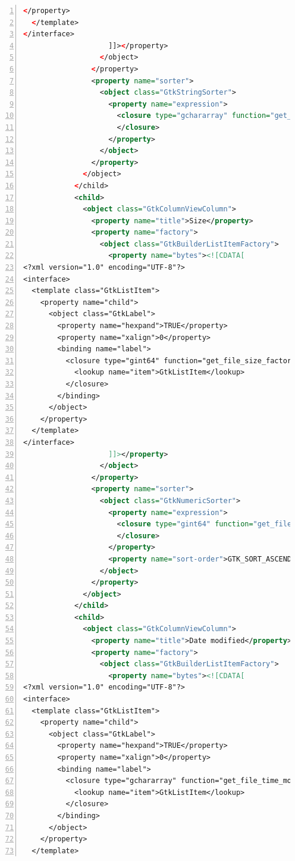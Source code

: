 \begin{lstlisting}[language=XML, numbers=left]
    </property>
  </template>
</interface>
                    ]]></property>
                  </object>
                </property>
                <property name="sorter">
                  <object class="GtkStringSorter">
                    <property name="expression">
                      <closure type="gchararray" function="get_file_name">
                      </closure>
                    </property>
                  </object>
                </property>
              </object>
            </child>
            <child>
              <object class="GtkColumnViewColumn">
                <property name="title">Size</property>
                <property name="factory">
                  <object class="GtkBuilderListItemFactory">
                    <property name="bytes"><![CDATA[
<?xml version="1.0" encoding="UTF-8"?>
<interface>
  <template class="GtkListItem">
    <property name="child">
      <object class="GtkLabel">
        <property name="hexpand">TRUE</property>
        <property name="xalign">0</property>
        <binding name="label">
          <closure type="gint64" function="get_file_size_factory">
            <lookup name="item">GtkListItem</lookup>
          </closure>
        </binding>
      </object>
    </property>
  </template>
</interface>
                    ]]></property>
                  </object>
                </property>
                <property name="sorter">
                  <object class="GtkNumericSorter">
                    <property name="expression">
                      <closure type="gint64" function="get_file_size">
                      </closure>
                    </property>
                    <property name="sort-order">GTK_SORT_ASCENDING</property>
                  </object>
                </property>
              </object>
            </child>
            <child>
              <object class="GtkColumnViewColumn">
                <property name="title">Date modified</property>
                <property name="factory">
                  <object class="GtkBuilderListItemFactory">
                    <property name="bytes"><![CDATA[
<?xml version="1.0" encoding="UTF-8"?>
<interface>
  <template class="GtkListItem">
    <property name="child">
      <object class="GtkLabel">
        <property name="hexpand">TRUE</property>
        <property name="xalign">0</property>
        <binding name="label">
          <closure type="gchararray" function="get_file_time_modified_factory">
            <lookup name="item">GtkListItem</lookup>
          </closure>
        </binding>
      </object>
    </property>
  </template>

\end{lstlisting}
